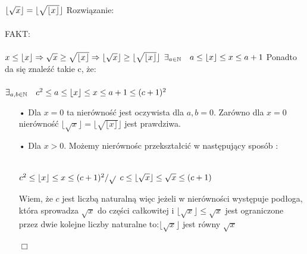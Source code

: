 \documentclass[fleqn]{article}
\begin{document}
$
\lfloor\sqrt{x}\rfloor = \lfloor\sqrt{\lfloor x \rfloor} \rfloor \newline \newline
$
Rozwiązanie: \\ \\
FAKT: \\ \\
$
x \leq \lfloor x\rfloor \Rightarrow \sqrt{x} \geq \sqrt{\lfloor x \rfloor} \Rightarrow \lfloor \sqrt{x} \rfloor \geq\lfloor \sqrt{\lfloor x \rfloor} \rfloor \newline \newline 
$
$
\exists_{a\in\mathbb{N}}\ \ \ a\leq\lfloor x \rfloor \leq x \leq a + 1 \newline \newline
$
Ponadto da się znaleźć takie c, że: \\ \\
$
\exists_{a,b\in\mathbb{N}}\ \ \ c^{2} \leq a\leq\lfloor x \rfloor \leq x \leq a + 1 \leq (c+1)^2 \newline \newline
$
\begin{itemize}
\item[•] Dla $x = 0$ ta nierówność jest oczywista dla $a,b = 0$. Zarówno dla $x=0$ nierówność
$\lfloor\sqrt{x}\rfloor = \lfloor\sqrt{\lfloor x \rfloor} \rfloor $ jest prawdziwa.
\item[•] Dla $x>0$. Możemy nierównośc przekształcić w następujący sposób : \\ \\
\begin{center}
$ c^{2} \leq \lfloor x \rfloor \leq x \leq (c+1)^2 /\sqrt{}\newline \newline$
$ c \leq \lfloor \sqrt{x} \rfloor \leq \sqrt{x} \leq (c+1) \newline \newline$
\end{center}
Wiem, że $c$ jest liczbą naturalną więc jeżeli w nierówności występuje podłoga, która sprowadza $\sqrt{x}$ do części całkowitej i $\lfloor \sqrt{x} \rfloor \leq \sqrt{x}$ jest ograniczone przez dwie kolejne liczby naturalne to:$\lfloor \sqrt{x} \rfloor$ jest równy $ \sqrt{x} $
 \begin{flushright}
 $\Box$
 \end{flushright}


\end{itemize}
\end{document}
